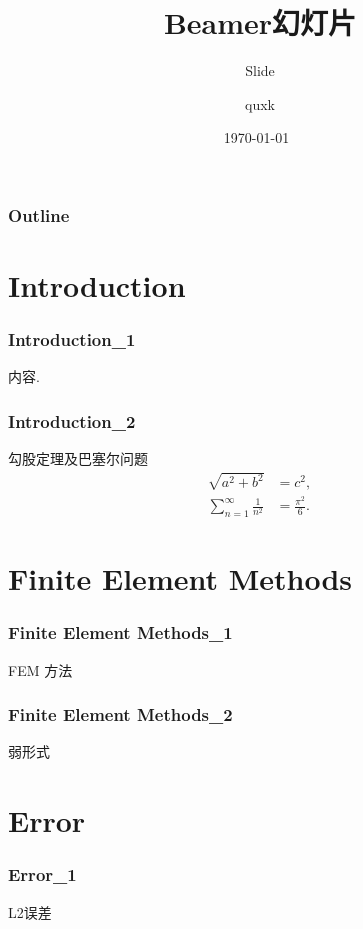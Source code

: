 \documentclass{beamer}
\title[曲面偏微分方程数值解]{Beamer幻灯片}
\subtitle[ppt篇]{Slide}
\author{quxk}
\date{\small \today \ \\ {\it}}
\institute[LSEC]{中国科学院大学}
\begin{document}
\begin{frame} 
	\titlepage 
\end{frame} 
    


\begin{frame}
\frametitle{Outline}
\tableofcontents
\end{frame}


\section{Introduction}
\begin{frame}
\frametitle{Introduction\_1}
内容.
\end{frame}

\begin{frame}
\frametitle{Introduction\_2}
\begin{block}{勾股定理及巴塞尔问题}
\begin{align*}
\sqrt{a^2 + b^2} &= c^2,\\
\sum_{n=1}^\infty \frac1{n^2}&=\frac{\pi^2}6.
\end{align*}
\end{block}
\end{frame}


\section{Finite Element Methods}
\begin{frame}
\frametitle{Finite Element Methods\_1}
FEM 方法
\end{frame}

\begin{frame}
\frametitle{Finite Element Methods\_2}
弱形式
\end{frame}

\section{Error}
\begin{frame}
\frametitle{Error\_1}
L2误差
\end{frame}
\end{document}
